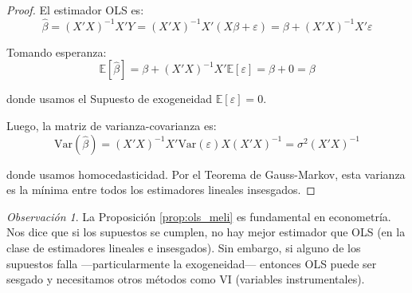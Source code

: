 \documentclass[12pt, a4paper]{article}
\theoremstyle{definition}
\theoremstyle{remark}
\newtheorem{remark}{Observación}
\begin{document}
\begin{proof}
  El estimador OLS es:
  \[
    \hat{\beta} = (X'X)^{-1}X'Y = (X'X)^{-1}X'(X\beta + \varepsilon) 
              = \beta + (X'X)^{-1}X'\varepsilon
  \]
  
  Tomando esperanza:
  \[
    \mathbb{E}[\hat{\beta}] = \beta + (X'X)^{-1}X'\mathbb{E}[\varepsilon]
                            = \beta + 0 = \beta
  \]
  
  donde usamos el Supuesto de exogeneidad $\mathbb{E}[\varepsilon] = 0$.
  
  Luego, la matriz de varianza-covarianza es:
  \[
    \text{Var}(\hat{\beta}) = (X'X)^{-1}X'\text{Var}(\varepsilon)X(X'X)^{-1}
                            = \sigma^2 (X'X)^{-1}
  \]
  
  donde usamos homocedasticidad. Por el Teorema de Gauss-Markov, esta varianza 
  es la mínima entre todos los estimadores lineales insesgados.
\end{proof}

\begin{remark}
  La Proposición \ref{prop:ols_meli} es fundamental en econometría. Nos dice 
  que si los supuestos se cumplen, no hay mejor estimador que OLS (en la clase 
  de estimadores lineales e insesgados). Sin embargo, si alguno de los supuestos 
  falla —particularmente la exogeneidad— entonces OLS puede ser sesgado y 
  necesitamos otros métodos como VI (variables instrumentales).
\end{remark}
\end{document}
